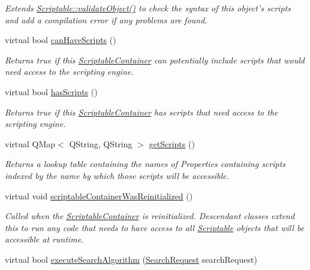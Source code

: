 \begin{DoxyCompactItemize}
\begin{DoxyCompactList}\small\item\em Extends \hyperlink{class_picto_1_1_scriptable_ab6e2944c43a3b5d418bf7b251594386d}{Scriptable\-::validate\-Object()} to check the syntax of this object's scripts and add a compilation error if any problems are found. \end{DoxyCompactList}\item 
\hypertarget{class_picto_1_1_scriptable_container_a1dd4cb7038c3775ca19071bec78b3b1b}{virtual bool \hyperlink{class_picto_1_1_scriptable_container_a1dd4cb7038c3775ca19071bec78b3b1b}{can\-Have\-Scripts} ()}\label{class_picto_1_1_scriptable_container_a1dd4cb7038c3775ca19071bec78b3b1b}

\begin{DoxyCompactList}\small\item\em Returns true if this \hyperlink{class_picto_1_1_scriptable_container}{Scriptable\-Container} can potentially include scripts that would need access to the scripting engine. \end{DoxyCompactList}\item 
virtual bool \hyperlink{class_picto_1_1_scriptable_container_acb933156df40af1820e623fa92d051a4}{has\-Scripts} ()
\begin{DoxyCompactList}\small\item\em Returns true if this \hyperlink{class_picto_1_1_scriptable_container}{Scriptable\-Container} has scripts that need access to the scripting engine. \end{DoxyCompactList}\item 
virtual Q\-Map$<$ Q\-String, Q\-String $>$ \hyperlink{class_picto_1_1_scriptable_container_a6476dc86309bfa82d6b02b04e7dba4cf}{get\-Scripts} ()
\begin{DoxyCompactList}\small\item\em Returns a lookup table containing the names of Properties containing scripts indexed by the name by which those scripts will be accessible. \end{DoxyCompactList}\item 
virtual void \hyperlink{class_picto_1_1_scriptable_container_acabb0f86283aefd4e247f076b56504cd}{scriptable\-Container\-Was\-Reinitialized} ()
\begin{DoxyCompactList}\small\item\em Called when the \hyperlink{class_picto_1_1_scriptable_container}{Scriptable\-Container} is reinitialized. Descendant classes extend this to run any code that needs to have access to all \hyperlink{class_picto_1_1_scriptable}{Scriptable} objects that will be accessible at runtime. \end{DoxyCompactList}\item 
\hypertarget{class_picto_1_1_scriptable_container_aae46c50e128e021f5ad66cb8b419c65a}{virtual bool \hyperlink{class_picto_1_1_scriptable_container_aae46c50e128e021f5ad66cb8b419c65a}{execute\-Search\-Algorithm} (\hyperlink{struct_search_request}{Search\-Request} search\-Request)}\label{class_picto_1_1_scriptable_container_aae46c50e128e021f5ad66cb8b419c65a}


\end{DoxyCompactItemize}
